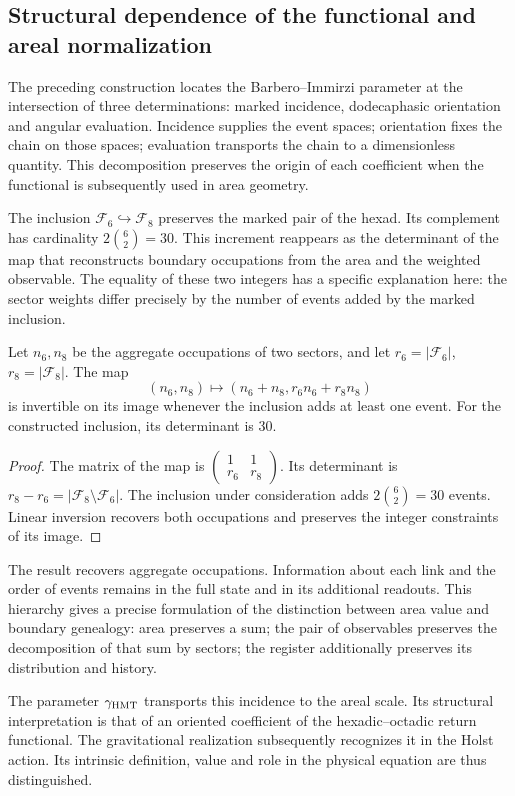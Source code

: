 \subsection{Structural dependence of the functional and areal normalization}

The preceding construction locates the Barbero--Immirzi parameter at the
intersection of three determinations: marked incidence, dodecaphasic
orientation and angular evaluation. Incidence supplies the event
spaces; orientation fixes the chain on those spaces; evaluation
transports the chain to a dimensionless quantity. This
decomposition preserves the origin of each coefficient when
the functional is subsequently used in area geometry.

The inclusion \(\mathcal F_6\hookrightarrow\mathcal F_8\) preserves
the marked pair of the hexad. Its complement has cardinality
\(2\binom62=30\). This increment reappears as the determinant of the
map that reconstructs boundary occupations from the area and
the weighted observable. The equality of these two integers has a
specific explanation here: the sector weights differ precisely
by the number of events added by the marked inclusion.

\begin{proposition}
Let \(n_6,n_8\) be the aggregate occupations of two sectors, and let
\(r_6=|\mathcal F_6|\), \(r_8=|\mathcal F_8|\). The map
\[
 (n_6,n_8)\longmapsto(n_6+n_8,r_6n_6+r_8n_8)
\]
is invertible on its image whenever the inclusion adds at least one
event. For the constructed inclusion, its determinant is 30.
\end{proposition}
\begin{proof}
The matrix of the map is
\(\left(\begin{smallmatrix}1&1\\r_6&r_8\end{smallmatrix}\right)\).
Its determinant is \(r_8-r_6=|\mathcal F_8\setminus\mathcal F_6|\).
The inclusion under consideration adds \(2\binom62=30\) events. Linear
inversion recovers both occupations and preserves the integer constraints
of its image.
\end{proof}

The result recovers aggregate occupations. Information about
each link and the order of events remains in the full state
and in its additional readouts. This hierarchy gives a precise
formulation of the distinction between area value and boundary genealogy:
area preserves a sum; the pair of observables preserves the
decomposition of that sum by sectors; the register additionally preserves
its distribution and history.

The parameter \(\gamma_{\mathrm{HMT}}\) transports this incidence to the areal
scale. Its structural interpretation is that of an oriented coefficient
of the hexadic--octadic return functional. The gravitational realization
subsequently recognizes it in the Holst action. Its intrinsic
definition, value and role in the physical equation are thus distinguished.
